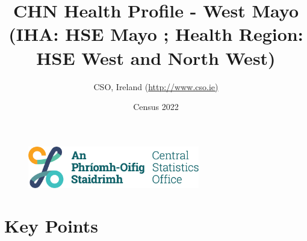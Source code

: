 \documentclass{article}
\title{CHN Health Profile - West Mayo (IHA: HSE Mayo ;  Health Region: HSE West and North West) }
\date{Census 2022}
\author{CSO, Ireland  (\url{http://www.cso.ie)}}
\begin{document}


\begin{figure}
	\centering
\includegraphics[width =75mm]{../figures/CSO_Logo.png}
\end{figure}

				 
		   
						  
														  
																																													
												 
			 
\maketitle
					
													   
				 
						 
																																																																											   
				 
				  
  \pagebreak
    	    \tableofcontents

\pagebreak


\section{Key Points}
\end{document}
